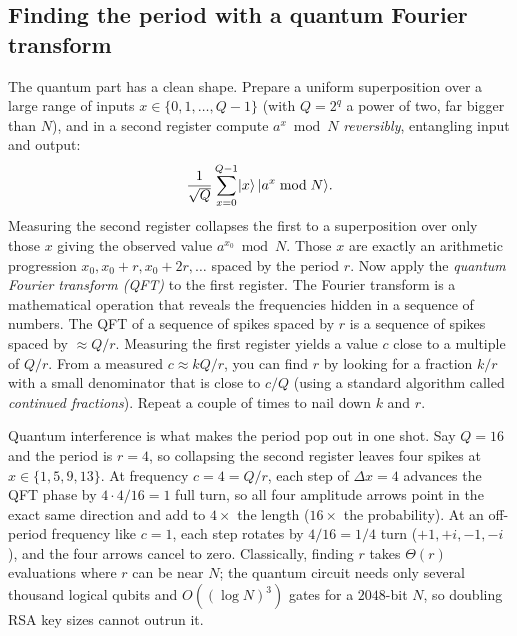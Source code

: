 \subsection{Finding the period with a quantum Fourier transform}
\label{ch35:qft}

The quantum part has a clean shape. Prepare a uniform superposition over a large range of inputs $x \in \{0,1,\dots,Q-1\}$ (with $Q=2^q$ a power of two, far bigger than $N$), and in a second register compute $a^x \bmod N$ \emph{reversibly}, entangling input and output:
\[
  \frac{1}{\sqrt{Q}}\sum_{x=0}^{Q-1}\lvert x \rangle\,\lvert a^x \bmod N \rangle.
\]
Measuring the second register collapses the first to a superposition over only those $x$ giving the observed value $a^{x_0}\bmod N$. Those $x$ are exactly an arithmetic progression $x_0, x_0+r, x_0+2r,\dots$ spaced by the period $r$. Now apply the \emph{quantum Fourier transform (QFT)} to the first register. The Fourier transform is a mathematical operation that reveals the frequencies hidden in a sequence of numbers. The QFT of a sequence of spikes spaced by $r$ is a sequence of spikes spaced by $\approx Q/r$. Measuring the first register yields a value $c$ close to a multiple of $Q/r$. From a measured $c \approx kQ/r$, you can find $r$ by looking for a fraction $k/r$ with a small denominator that is close to $c/Q$ (using a standard algorithm called \emph{continued fractions}). Repeat a couple of times to nail down $k$ and $r$.

\begin{whybox}
Quantum interference is what makes the period pop out in one shot. Say $Q = 16$ and the period is $r = 4$, so collapsing the second register leaves four spikes at $x \in \{1, 5, 9, 13\}$. At frequency $c = 4 = Q/r$, each step of $\Delta x = 4$ advances the QFT phase by $4 \cdot 4 / 16 = 1$ full turn, so all four amplitude arrows point in the exact same direction and add to $4\times$ the length ($16\times$ the probability). At an off-period frequency like $c = 1$, each step rotates by $4/16 = 1/4$ turn ($+1, +i, -1, -i$), and the four arrows cancel to zero. Classically, finding $r$ takes $\Theta(r)$ evaluations where $r$ can be near $N$; the quantum circuit needs only several thousand logical qubits and $O((\log N)^3)$ gates for a $2048$-bit $N$, so doubling RSA key sizes cannot outrun it.
\end{whybox}

